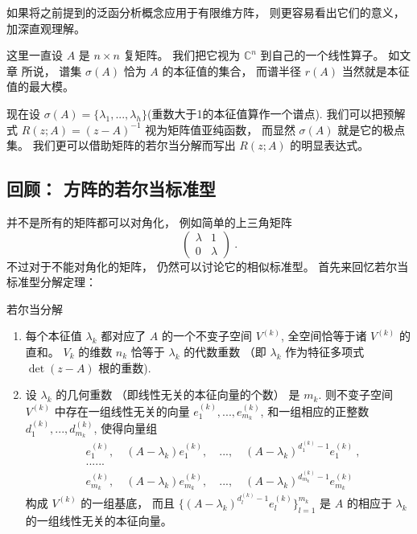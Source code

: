 

如果将之前提到的泛函分析概念应用于有限维方阵， 则更容易看出它们的意义， 加深直观理解。 

这里一直设 $A$ 是 $n\times n$ 复矩阵。 我们把它视为 $\mathbb{C}^n$ 到自己的一个线性算子。 如文章  所说， 谱集 $\sigma(A)$ 恰为 $A$ 的本征值的集合， 而谱半径 $r(A)$ 当然就是本征值的最大模。 

现在设 $\sigma(A)=\{\lambda_1,...,\lambda_h\}$(重数大于1的本征值算作一个谱点). 我们可以把预解式 $R(z;A)=(z-A)^{-1}$ 视为矩阵值亚纯函数， 而显然 $\sigma(A)$ 就是它的极点集。 我们更可以借助矩阵的若尔当分解而写出 $R(z;A)$ 的明显表达式。 

\subsection{回顾： 方阵的若尔当标准型}
并不是所有的矩阵都可以对角化， 例如简单的上三角矩阵
$$
\left(
\begin{matrix}
\lambda & 1 \\
0 & \lambda
\end{matrix}
\right)~.
$$
不过对于不能对角化的矩阵， 仍然可以讨论它的相似标准型。 首先来回忆若尔当标准型分解定理：

\begin{theorem}{若尔当分解}
\begin{enumerate}
\item 每个本征值 $\lambda_k$ 都对应了 $A$ 的一个不变子空间 $V^{(k)}$, 全空间恰等于诸 $V^{(k)}$ 的直和。 $V_k$ 的维数 $n_k$ 恰等于 $\lambda_k$ 的代数重数 （即 $\lambda_k$ 作为特征多项式 $\det(z-A)$ 根的重数).
\item 设 $\lambda_k$ 的几何重数 （即线性无关的本征向量的个数） 是 $m_k$. 则不变子空间 $V^{(k)}$ 中存在一组线性无关的向量 $e^{(k)}_1,...,e^{(k)}_{m_k}$, 和一组相应的正整数 $d^{(k)}_1,...,d^{(k)}_{m_k}$, 使得向量组
$$
\begin{aligned}
&e^{(k)}_1,\quad(A-\lambda_k)e^{(k)}_1,\quad...,\quad(A-\lambda_k)^{d^{(k)}_1-1}e^{(k)}_1~,\\
&......\\
&e^{(k)}_{m_k},\quad(A-\lambda_k)e^{(k)}_{m_k},\quad...,\quad(A-\lambda_k)^{d^{(k)}_{m_k}-1}e^{(k)}_{m_k}~
\end{aligned}
$$
构成 $V^{(k)}$ 的一组基底， 而且 $\{(A-\lambda_k)^{d^{(k)}_l-1}e^{(k)}_l\}_{l=1}^{m_k}$ 是 $A$ 的相应于 $\lambda_k$ 的一组线性无关的本征向量。
\end{enumerate}
\end{theorem}

